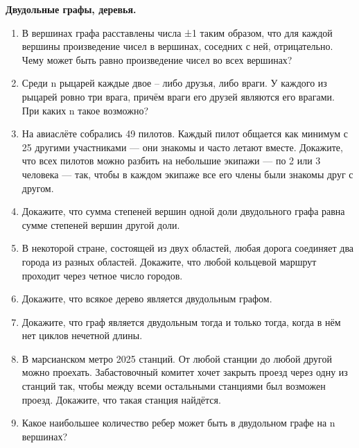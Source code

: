 \documentclass[a4paper,12pt]{article}
\begin{document}
\begin{center}
    {\Large \textbf{Двудольные графы, деревья.}}\\[0.5em]
\end{center}
    
\begin{enumerate}[label=\textbf{Задача \arabic*.}]
  \item В вершинах графа расставлены числа ±1 таким образом, что для каждой вершины произведение чисел в вершинах, соседних с ней, отрицательно. Чему может быть равно произведение чисел во всех вершинах?
  \item Среди n рыцарей каждые двое – либо друзья, либо враги. У каждого из рыцарей ровно три врага, причём враги его друзей являются его врагами. При каких n такое возможно?
  \item На авиаслёте собрались 49 пилотов.
    Каждый пилот общается как минимум с 25 другими участниками — они знакомы и часто летают вместе. Докажите, что всех пилотов можно разбить на небольшие экипажи — по 2 или 3 человека — так, чтобы в каждом экипаже все его члены были знакомы друг с другом.

    \item Докажите, что сумма степеней вершин одной доли двудольного графа равна сумме степеней вершин другой доли.

    \item В некоторой стране, состоящей из двух областей, любая дорога соединяет два города из разных областей. Докажите, что любой кольцевой маршрут проходит через четное число городов.

    \item Докажите, что всякое дерево является двудольным графом.

    \item Докажите, что граф является двудольным тогда и только тогда, когда в нём нет циклов нечетной длины.

    \item В марсианском метро 2025 станций. От любой станции до любой другой можно проехать. Забастовочный комитет хочет закрыть проезд через одну из станций так, чтобы между всеми остальными станциями был возможен проезд. Докажите, что такая станция найдётся.
    \item Какое наибольшее количество ребер может быть в двудольном графе на n вершинах?
\end{enumerate}
\end{document}
